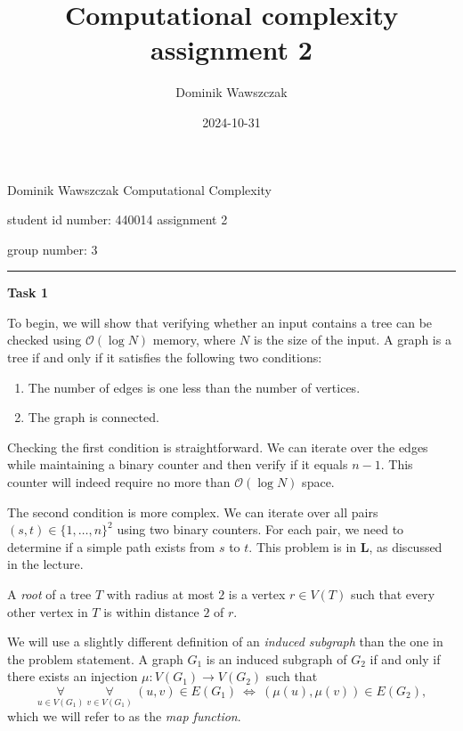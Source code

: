 \documentclass[12pt]{article}
\title{Computational complexity assignment 2}
\author{Dominik Wawszczak}
\date{2024-10-31}
\begin{document}
	\setlength{\parindent}{0 cm}
	
	Dominik Wawszczak \hfill Computational Complexity
	
	student id number: 440014 \hfill assignment 2
	
	group number: 3
	
	\bigskip
	\hrule
	\bigskip
	
	\textbf{Task 1}
	
	\medskip
	
	To begin, we will show that verifying whether an input contains a tree can
	be checked using \(\mathcal{O}(\log N)\) memory, where \(N\) is the size of
	the input. A graph is a tree if and only if it satisfies the following two
	conditions:
	\begin{enumerate}
		\item The number of edges is one less than the number of vertices.
		\item The graph is connected.
	\end{enumerate}
	Checking the first condition is straightforward. We can iterate over the
	edges while maintaining a binary counter and then verify if it equals
	\(n - 1\). This counter will indeed require no more than
	\(\mathcal{O}(\log N)\) space.
	
	\medskip
	
	The second condition is more complex. We can iterate over all pairs \((s, t)
	\in \{1, \ldots, n\}^{2}\) using two binary counters. For each pair, we need
	to determine if a simple path exists from \(s\) to \(t\). This problem is in
	\(\mathbf{L}\), as discussed in the lecture.
	
	\medskip
	
	A \textit{root} of a tree \(T\) with radius at most \(2\) is a vertex \(r
	\in V(T)\) such that every other vertex in \(T\) is within distance \(2\) of
	\(r\).
	
	\medskip
	
	We will use a slightly different definition of an \textit{induced subgraph}
	than the one in the problem statement. A graph \(G_{1}\) is an induced
	subgraph of \(G_{2}\) if and only if there exists an injection \(\mu :
	V(G_{1}) \to V(G_{2})\) such that
	\[ \underset{u \in V(G_{1})}{\forall} \ \underset{v \in V(G_{1})}{\forall} \
	(u, v) \in E(G_{1}) \ \iff \ (\mu(u), \mu(v)) \in E(G_{2}) \text{,} \]
	which we will refer to as the \textit{map function}.
	
	\medskip
	
\end{document}
